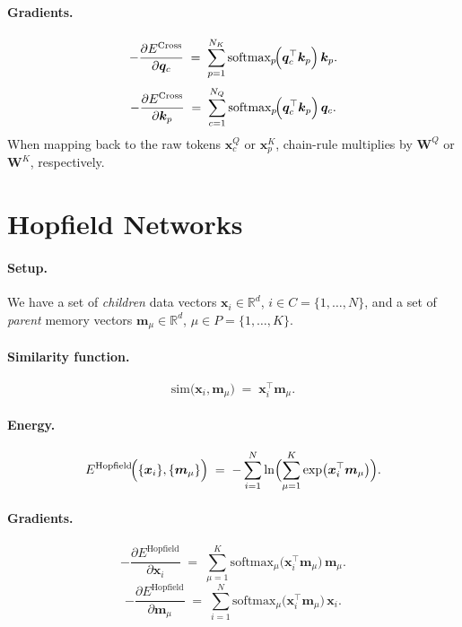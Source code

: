 \documentclass{article}
\begin{document}
\paragraph{Gradients.}
\begin{equation}
-\frac{\partial E^{\mathrm{Cross}}}{\partial \bm{q}_c}
\;=\;
\sum_{p=1}^{N_K}
\text{softmax}_{p}\!\Bigl(\bm{q}_c^\top \bm{k}_p \Bigr)\,
\bm{k}_p.
\end{equation}
\begin{equation}
-\frac{\partial E^{\mathrm{Cross}}}{\partial \bm{k}_p}
\;=\;
\sum_{c=1}^{N_Q}
\text{softmax}_{p}\!\Bigl(\bm{q}_c^\top \bm{k}_p \Bigr)\,
\bm{q}_c.
\end{equation}
When mapping back to the raw tokens \(\bm{x}^Q_c\) or \(\bm{x}^K_p\), chain-rule multiplies by \(\bm{W}^Q\) or \(\bm{W}^K\), respectively.

\section{Hopfield Networks}

\paragraph{Setup.}
We have a set of \emph{children} data vectors \(\bm{x}_i \in \mathbb{R}^d\), \(i\in C=\{1,\ldots,N\}\), and a set of \emph{parent} memory vectors \(\bm{m}_\mu \in \mathbb{R}^d\), \(\mu\in P=\{1,\ldots,K\}\).

\paragraph{Similarity function.}
\[
\mathrm{sim}\bigl(\bm{x}_i, \bm{m}_\mu\bigr)
\;=\;
\bm{x}_i^\top \bm{m}_\mu.
\]

\paragraph{Energy.}
\begin{equation}
E^{\mathrm{Hopfield}}\!\Bigl(\{\bm{x}_i\}, \{\bm{m}_\mu\}\Bigr)
\;=\;
-\sum_{i=1}^N
\ln \Bigl(\sum_{\mu=1}^K
\exp \bigl(\bm{x}_i^\top \bm{m}_\mu\bigr)\Bigr).
\end{equation}

\paragraph{Gradients.}
\begin{equation}
-\frac{\partial E^{\mathrm{Hopfield}}}{\partial \bm{x}_i}
\;=\;
\sum_{\mu=1}^K
\text{softmax}_{\mu}\!\bigl(\bm{x}_i^\top \bm{m}_\mu\bigr)\,
\bm{m}_\mu.
\end{equation}
\begin{equation}
-\frac{\partial E^{\mathrm{Hopfield}}}{\partial \bm{m}_\mu}
\;=\;
\sum_{i=1}^N
\text{softmax}_{\mu}\!\bigl(\bm{x}_i^\top \bm{m}_\mu\bigr)\,
\bm{x}_i.
\end{equation}
\end{document}
